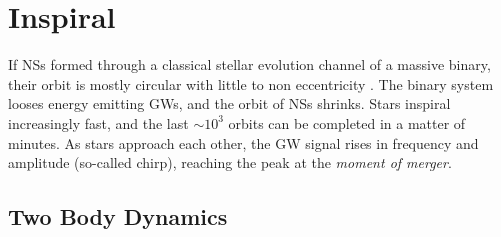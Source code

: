 







\section{Inspiral}

If \acp{NS} formed through a classical stellar evolution channel of a massive binary, 
their orbit is mostly circular with little to non eccentricity \citep{Aasi:2013wya}. 
%
The binary system looses energy emitting \acp{GW}, and the orbit of \acp{NS} 
shrinks. Stars inspiral increasingly fast, and the last ${\sim}10^3$ orbits can be completed in 
a matter of minutes. As stars approach each other, the \ac{GW} signal rises in 
frequency and amplitude (so-called chirp), reaching the peak at the \textit{moment of merger}.

\subsection{Two Body Dynamics}

